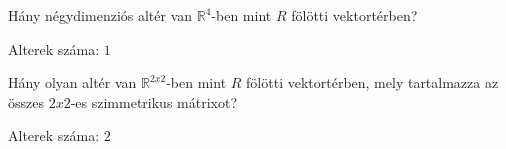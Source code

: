 \begin{frame}
  \begin{tcolorbox}[title={4/6. {\symrook}}]
      Hány négydimenziós altér van $\mathbb{R}^4$-ben mint $R$ fölötti vektortérben?
  \tcblower

    \mmedskip 
    
    Alterek száma: $1$
  \end{tcolorbox}
\end{frame}


\begin{frame}
  \begin{tcolorbox}[title={4/7. {\symqueen}}]
      Hány olyan altér van $\mathbb{R}^{2 x 2}$-ben mint $R$ fölötti vektortérben, mely tartalmazza az összes $2 x 2$-es szimmetrikus mátrixot?
  \tcblower

    \mmedskip 
    
    Alterek száma: $2$
  \end{tcolorbox}
\end{frame}


